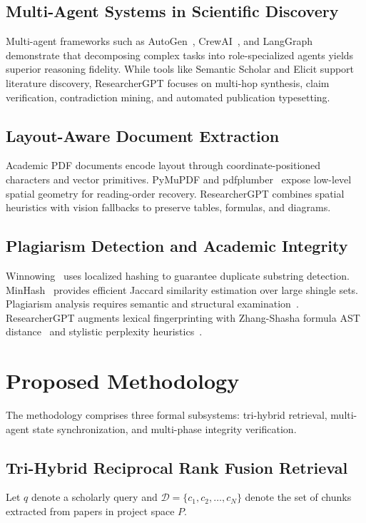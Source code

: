 \documentclass[conference]{IEEEtran}
\begin{document}
\subsection{Multi-Agent Systems in Scientific Discovery}
Multi-agent frameworks such as AutoGen~\cite{wu2023autogen}, CrewAI~\cite{moura2024crewai}, and LangGraph~\cite{langgraph2024} demonstrate that decomposing complex tasks into role-specialized agents yields superior reasoning fidelity. While tools like Semantic Scholar and Elicit support literature discovery, ResearcherGPT focuses on multi-hop synthesis, claim verification, contradiction mining, and automated publication typesetting.

\subsection{Layout-Aware Document Extraction}
Academic PDF documents encode layout through coordinate-positioned characters and vector primitives. PyMuPDF and pdfplumber~\cite{singer2023pdfplumber} expose low-level spatial geometry for reading-order recovery. ResearcherGPT combines spatial heuristics with vision fallbacks to preserve tables, formulas, and diagrams.

\subsection{Plagiarism Detection and Academic Integrity}
Winnowing~\cite{schleimer2003winnowing} uses localized hashing to guarantee duplicate substring detection. MinHash~\cite{broder1997minhash} provides efficient Jaccard similarity estimation over large shingle sets. Plagiarism analysis requires semantic and structural examination~\cite{foltynek2019plagiarism}. ResearcherGPT augments lexical fingerprinting with Zhang-Shasha formula AST distance~\cite{zhang1989tree} and stylistic perplexity heuristics~\cite{vaswani2017attention,devlin2019bert}.

\section{Proposed Methodology}
The methodology comprises three formal subsystems: tri-hybrid retrieval, multi-agent state synchronization, and multi-phase integrity verification.

\subsection{Tri-Hybrid Reciprocal Rank Fusion Retrieval}
Let $q$ denote a scholarly query and $\mathcal{D} = \{c_1, c_2, \ldots, c_N\}$ denote the set of chunks extracted from papers in project space $P$.
\end{document}
